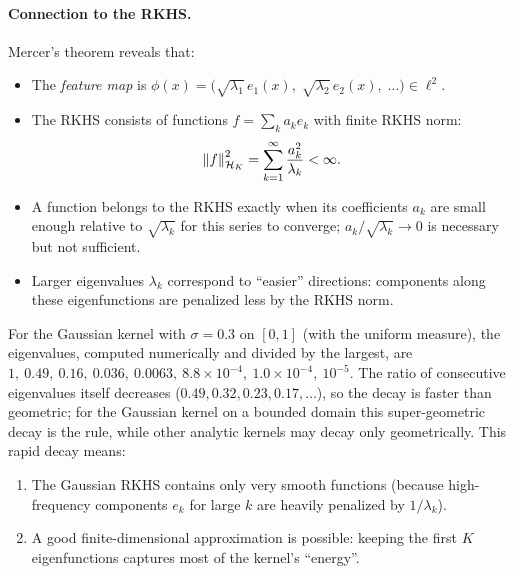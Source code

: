 \begin{notechapter}
\paragraph{Connection to the RKHS.} Mercer's theorem reveals that:
\begin{itemize}
  \item The \emph{feature map} is $\phi(x) =
  \bigl(\sqrt{\lambda_1}\,e_1(x),\; \sqrt{\lambda_2}\,e_2(x),\;
  \ldots\bigr) \in \ell^2$.
  \item The RKHS consists of functions $f = \sum_k a_k e_k$ with finite
  RKHS norm:
  \begin{equation}
  \left\|f\right\|_{\mathcal{H}_K}^2 = \sum_{k=1}^\infty \frac{a_k^2}{\lambda_k} < \infty.
  \end{equation}
  \item A function belongs to the RKHS exactly when its coefficients $a_k$ are small
  enough relative to $\sqrt{\lambda_k}$ for this series to converge; $a_k/\sqrt{\lambda_k}\to0$
  is necessary but not sufficient.
  \item Larger eigenvalues $\lambda_k$ correspond to ``easier''
  directions: components along these eigenfunctions are penalized less
  by the RKHS norm.
\end{itemize}

\begin{example}
For the Gaussian kernel with $\sigma = 0.3$ on $[0,1]$ (with the uniform measure), the eigenvalues, computed numerically and divided by the largest, are $1,\ 0.49,\ 0.16,\ 0.036,\ 0.0063,\ 8.8\times10^{-4},\ 1.0\times10^{-4},\ 10^{-5}$. The ratio of consecutive eigenvalues itself decreases ($0.49, 0.32, 0.23, 0.17, \ldots$), so the decay is faster than geometric; for the Gaussian kernel on a bounded domain this super-geometric decay is the rule, while other analytic kernels may decay only geometrically. This rapid decay means:

\begin{enumerate}
  \item The Gaussian RKHS contains only very smooth functions (because
  high-frequency components $e_k$ for large $k$ are heavily penalized by
  $1/\lambda_k$).
  \item A good finite-dimensional approximation is possible: keeping the
  first $K$ eigenfunctions captures most of the kernel's ``energy''.
\end{enumerate}
\end{example}


\end{notechapter}
